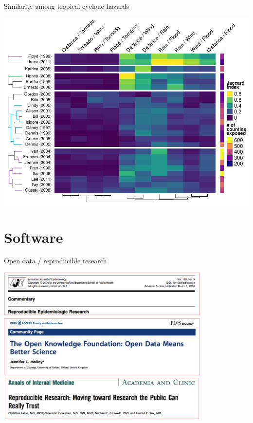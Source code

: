 \documentclass[ignorenonframetext,]{beamer}
\begin{document}
\begin{frame}{Similarity among tropical cyclone hazards}

\begin{center}\includegraphics[width=\textwidth]{figures/jaccard_heatmap_presentation} \end{center}

\end{frame}

\section{Software}\label{software}

\begin{frame}{Open data / reproducible research}

\begin{center}\includegraphics[width=0.8\textwidth]{figures/open_data_headlines} \end{center}

\end{frame}
\end{document}
